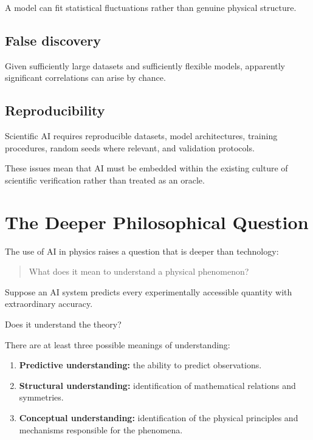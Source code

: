\documentclass[11pt,a4paper]{article}
\begin{document}
A model can fit statistical fluctuations rather than genuine physical structure.

\subsection{False discovery}

Given sufficiently large datasets and sufficiently flexible models, apparently
significant correlations can arise by chance.

\subsection{Reproducibility}

Scientific AI requires reproducible datasets, model architectures, training
procedures, random seeds where relevant, and validation protocols.

These issues mean that AI must be embedded within the existing culture of
scientific verification rather than treated as an oracle.

\section{The Deeper Philosophical Question}

The use of AI in physics raises a question that is deeper than technology:

\begin{quote}
What does it mean to understand a physical phenomenon?
\end{quote}

Suppose an AI system predicts every experimentally accessible quantity with
extraordinary accuracy.

Does it understand the theory?

There are at least three possible meanings of understanding:

\begin{enumerate}
\item \textbf{Predictive understanding:} the ability to predict observations.

\item \textbf{Structural understanding:} identification of mathematical
relations and symmetries.

\item \textbf{Conceptual understanding:} identification of the physical
principles and mechanisms responsible for the phenomena.
\end{enumerate}
\end{document}
